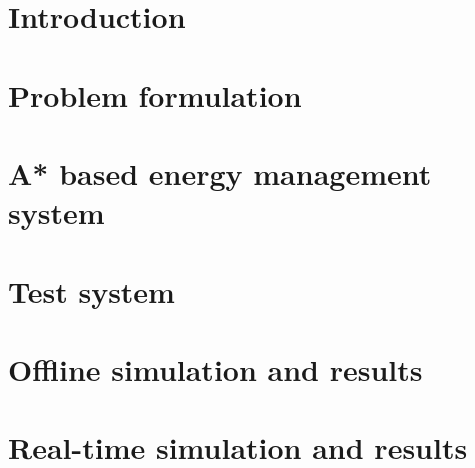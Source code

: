 \documentclass[journal]{IEEEtran}
\begin{document}
\section{Introduction}


\section{Problem formulation} \label{formulation}


\section{A* based energy management system} \label{A*}


\section{Test system} \label{sys}


\section{Offline simulation and results} \label{OFF}


\section{Real-time simulation and results} \label{RT}



% 
% 
\end{document}
